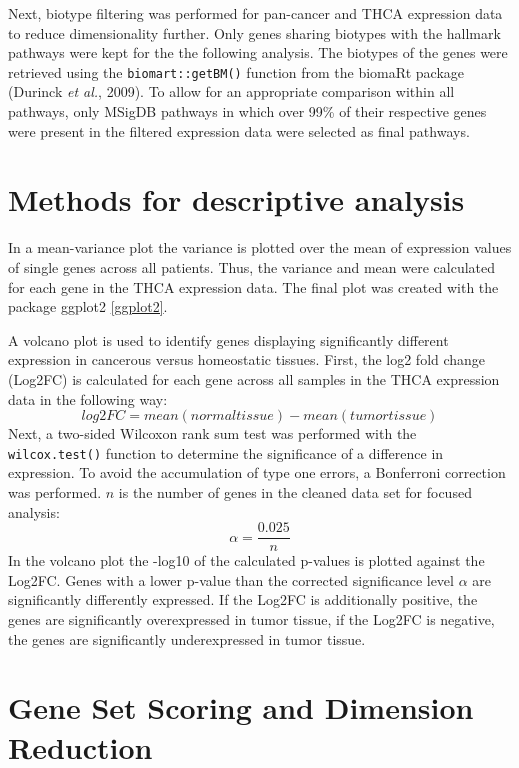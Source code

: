 \documentclass[
  parskip,
  oneside]{scrreprt}
\begin{document}
Next, biotype filtering was performed for pan-cancer and THCA expression
data to reduce dimensionality further. Only genes sharing biotypes with
the hallmark pathways were kept for the the following analysis. The
biotypes of the genes were retrieved using the \texttt{biomart::getBM()}
function from the biomaRt package (Durinck \emph{et al.}, 2009). To
allow for an appropriate comparison within all pathways, only MSigDB
pathways in which over 99\% of their respective genes were present in
the filtered expression data were selected as final pathways.

\hypertarget{methods-for-descriptive-analysis}{%
\section{Methods for descriptive
analysis}\label{methods-for-descriptive-analysis}}

In a mean-variance plot the variance is plotted over the mean of
expression values of single genes across all patients. Thus, the
variance and mean were calculated for each gene in the THCA expression
data. The final plot was created with the package ggplot2 \ref{ggplot2}.

A volcano plot is used to identify genes displaying significantly
different expression in cancerous versus homeostatic tissues. First, the
log2 fold change (Log2FC) is calculated for each gene across all samples
in the THCA expression data in the following way: \[
log2FC = mean(normal tissue) - mean(tumor tissue)
\] Next, a two-sided Wilcoxon rank sum test was performed with the
\texttt{wilcox.test()} function to determine the significance of a
difference in expression. To avoid the accumulation of type one errors,
a Bonferroni correction was performed. \(n\) is the number of genes in
the cleaned data set for focused analysis: \[
\alpha = \frac{0.025}{n}
\] In the volcano plot the -log10 of the calculated p-values is plotted
against the Log2FC. Genes with a lower p-value than the corrected
significance level \(\alpha\) are significantly differently expressed.
If the Log2FC is additionally positive, the genes are significantly
overexpressed in tumor tissue, if the Log2FC is negative, the genes are
significantly underexpressed in tumor tissue.

\hypertarget{gene-set-scoring-and-dimension-reduction}{%
\section{Gene Set Scoring and Dimension
Reduction}\label{gene-set-scoring-and-dimension-reduction}}
\end{document}

